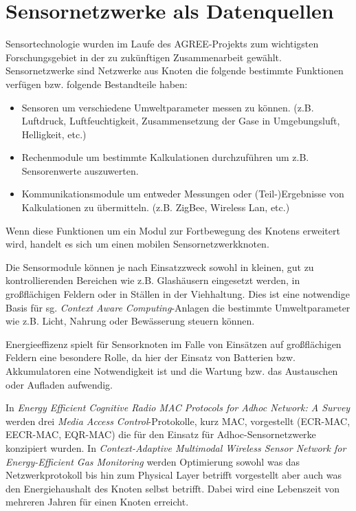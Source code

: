 \section{Sensornetzwerke als Datenquellen}
Sensortechnologie wurden im Laufe des AGREE-Projekts zum wichtigsten Forschungsgebiet in der zu zukünftigen Zusammenarbeit gewählt.\cite{misc:Mikkola2013} Sensornetzwerke sind Netzwerke aus Knoten die folgende bestimmte Funktionen verfügen bzw. folgende Bestandteile haben:
\begin{itemize}
	\item Sensoren um verschiedene Umweltparameter messen zu können. (z.B. Luftdruck, Luftfeuchtigkeit, Zusammensetzung der Gase in Umgebungsluft, Helligkeit, etc.)
	\item Rechenmodule um bestimmte Kalkulationen durchzuführen um z.B. Sensorenwerte auszuwerten.
	\item Kommunikationsmodule um entweder Messungen oder (Teil-)Ergebnisse von Kalkulationen zu übermitteln. (z.B. ZigBee, Wireless Lan, etc.)
\end{itemize}
Wenn diese Funktionen um ein Modul zur Fortbewegung des Knotens erweitert wird, handelt es sich um einen mobilen Sensornetzwerkknoten.\cite{jour:Howard2002}

Die Sensormodule können je nach Einsatzzweck sowohl in kleinen, gut zu kontrollierenden Bereichen wie z.B. Glashäusern eingesetzt werden, in großflächigen Feldern oder in Ställen in der Viehhaltung. Dies ist eine notwendige Basis für sg. \textit{Context Aware Computing}-Anlagen die bestimmte Umweltparameter wie z.B. Licht, Nahrung oder Bewässerung steuern können. 

Energieeffizenz spielt für Sensorknoten im Falle von Einsätzen auf großflächigen Feldern eine besondere Rolle, da hier der Einsatz von Batterien bzw. Akkumulatoren eine Notwendigkeit ist und die Wartung bzw. das Austauschen oder Aufladen aufwendig. 

In \textit{Energy Efficient Cognitive Radio MAC Protocols for Adhoc Network: A Survey} werden drei \textit{Media Access Control}-Protokolle, kurz MAC, vorgestellt (ECR-MAC, EECR-MAC, EQR-MAC) die für den Einsatz für Adhoc-Sensornetzwerke konzipiert wurden.\cite{conf:Zia2013} In \textit{Context-Adaptive Multimodal Wireless Sensor
Network for Energy-Efficient Gas Monitoring} werden Optimierung sowohl was das Netzwerkprotokoll bis hin zum Physical Layer betrifft vorgestellt aber auch was den Energiehaushalt des Knoten selbst betrifft. Dabei wird eine Lebenszeit von mehreren Jahren für einen Knoten erreicht.\cite{jour:Jelicic2013}

